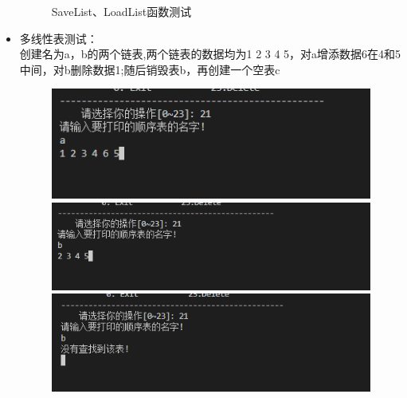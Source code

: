 \documentclass[supercite]{Experimental_Report}
\theoremstyle{definition}
\begin{document}
\begin{itemize}
\begin{figure}[htbp]
\begin{minipage}{0.9\linewidth}
		      \end{minipage}
		      \caption{SaveList、LoadList函数测试}
		      \label{fig1-19}
	      \end{figure}
	\item 多线性表测试：\\
	      创建名为a，b的两个链表,两个链表的数据均为1 2 3 4 5，对a增添数据6在4和5中间，对b删除数据1;随后销毁表b，再创建一个空表c\\
	      \begin{figure}[htbp]
		      \centering
		      \begin{minipage}{0.9\linewidth}
			      \centering
			      \includegraphics[width=0.9\linewidth]{images/test-52.png}
		      \end{minipage}
		      \begin{minipage}{0.9\linewidth}
			      \centering
			      \includegraphics[width=0.9\linewidth]{images/test-53.png}
		      \end{minipage}
		      \begin{minipage}{0.9\linewidth}
			      \centering
			      \includegraphics[width=0.9\linewidth]{images/test-54.png}
		      \end{minipage}
	      \end{figure}
	      \begin{figure}[htbp]
		      \centering
		      \begin{minipage}{0.9\linewidth}

\end{minipage}
\end{figure}
\end{itemize}
\end{document}
